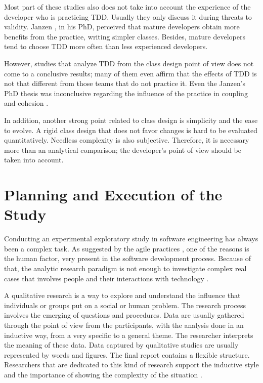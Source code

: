 \documentclass[times]{speauth}
\begin{document}
Most part of these studies also does not take into account the experience
of the developer who is practicing TDD. Usually they only discuss it
during threats to validity. Janzen \cite{janzen-phd}, in his PhD, perceived
that mature developers obtain more benefits from the practice, writing simpler
classes. Besides, mature developers tend to choose TDD more often than
less experienced developers.

However, studies that analyze TDD from the class design point of view does not
come to a conclusive results; many of them even affirm that the effects of TDD
is not that different from those teams that do not practice it. Even the Janzen's PhD
thesis was inconclusive regarding the influence of the practice in coupling
and cohesion \cite{janzen-phd}. 

In addition, another strong point related to class design is simplicity and
the ease to evolve. A rigid class design that does not favor changes is hard
to be evaluated quantitatively. Needless complexity is also subjective.
Therefore, it is necessary more than an analytical comparison; the
developer's point of view should be taken into account.

\section{Planning and Execution of the Study} 
\label{sec:planejamento}

Conducting an experimental exploratory study in software engineering has always
been a complex task. As suggested by the agile practices \cite{AgileManifesto}, 
one of the reasons is the human factor, very present in 
the software development process. Because of that, the analytic research
paradigm is not enough to investigate complex real cases that involves people
and their interactions with technology \cite{guidelines-case-study}.

A qualitative research is a way to explore and understand the influence that
individuals or groups put on a social or human problem. The research process
involves the emerging of questions and procedures. Data are usually gathered through
the point of view from the participants, with the analysis done in an inductive
way, from a very specific to a general theme. The researcher interprets
the meaning of these data. Data captured by qualitative studies are usually
represented by words and figures. The final report contains a flexible structure.
Researchers that are dedicated to this kind of research support the inductive style and
the importance of showing the complexity of the situation \cite{creswell}.
\end{document}

